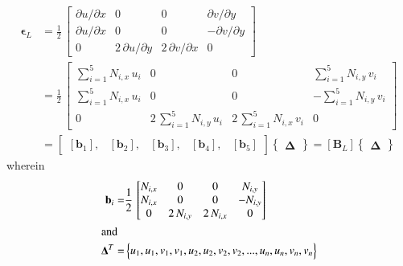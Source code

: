 \begin{equation}
\begin{aligned}
\boldsymbol{\epsilon}_L & = \frac{1}{2} \, \begin{bmatrix}
\partial u / \partial x & 0 & 0 &   \partial v / \partial y \\
\partial u / \partial x & 0 & 0 & - \partial v / \partial y \\
0 & 2 \, \partial u / \partial y & 2 \, \partial v / \partial x & 0 \end{bmatrix} \\
& = \frac{1}{2} \, \begin{bmatrix}
\sum\nolimits_{i=1}^5 N_{i,x} \, u_i & 0 & 0 &   \sum\nolimits_{i=1}^5 N_{i,y} \, v_i \\
\sum\nolimits_{i=1}^5 N_{i,x} \, u_i & 0 & 0 & - \sum\nolimits_{i=1}^5 N_{i,y} \, v_i \\
0 & 2 \, \sum\nolimits_{i=1}^5 N_{i,y} \, u_i & 2 \, \sum\nolimits_{i=1}^5 N_{i,x} \, v_i & 0 \end{bmatrix} \\
& = \begin{bmatrix}
[\mathbf{b}_1], & [\mathbf{b}_2], & [\mathbf{b}_3], & [\mathbf{b}_4], & [\mathbf{b}_5] 
\end{bmatrix}  \begin{Bmatrix} \boldsymbol{\Delta} \end{Bmatrix}  
= [\mathbf{B}_L] \begin{Bmatrix} \boldsymbol{\Delta} \end{Bmatrix} 
\end{aligned}
\end{equation}
wherein 
\begin{subequations}
\begin{align}
\mathbf{b}_i = &
\frac{1}{2} \, \begin{bmatrix}
N_{i,x} & 0 & 0 &   N_{i,y} \\
N_{i,x} & 0 & 0 & - N_{i,y} \\
0 & 2 \,  N_{i,y} & 2 \,  N_{i,x} & 0 \end{bmatrix}\\
\intertext{and}
\mathbf{\Delta}^T  = &
\begin{Bmatrix}
u_1 ,u_1, v_1, v_1, u_2 ,u_2, v_2, v_2, ..., u_n ,u_n, v_n, v_n
\end{Bmatrix}
\end{align}
\end{subequations}


